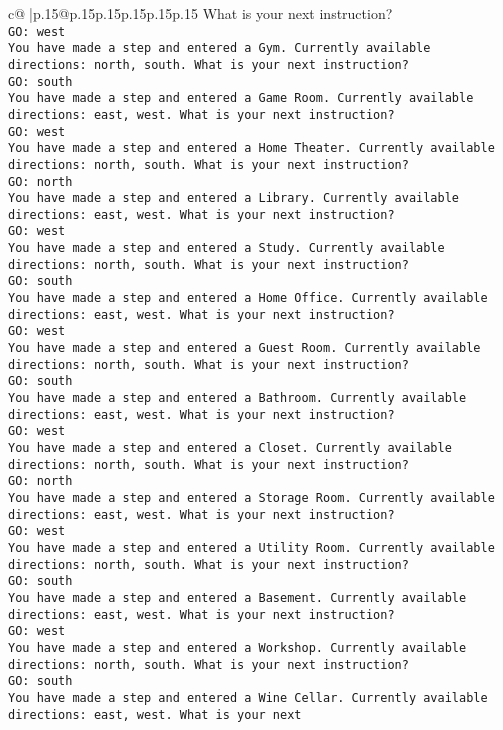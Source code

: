 \documentclass{article}
\begin{document}
{\begin{supertabular}{c@{$\;$}|p{.15\linewidth}@{}p{.15\linewidth}p{.15\linewidth}p{.15\linewidth}p{.15\linewidth}p{.15\linewidth}}
{{{What is your next instruction?\\ \tt GO: west\\ \tt You have made a step and entered a Gym. Currently available directions: north, south. What is your next instruction?\\ \tt GO: south\\ \tt You have made a step and entered a Game Room. Currently available directions: east, west. What is your next instruction?\\ \tt GO: west\\ \tt You have made a step and entered a Home Theater. Currently available directions: north, south. What is your next instruction?\\ \tt GO: north\\ \tt You have made a step and entered a Library. Currently available directions: east, west. What is your next instruction?\\ \tt GO: west\\ \tt You have made a step and entered a Study. Currently available directions: north, south. What is your next instruction?\\ \tt GO: south\\ \tt You have made a step and entered a Home Office. Currently available directions: east, west. What is your next instruction?\\ \tt GO: west\\ \tt You have made a step and entered a Guest Room. Currently available directions: north, south. What is your next instruction?\\ \tt GO: south\\ \tt You have made a step and entered a Bathroom. Currently available directions: east, west. What is your next instruction?\\ \tt GO: west\\ \tt You have made a step and entered a Closet. Currently available directions: north, south. What is your next instruction?\\ \tt GO: north\\ \tt You have made a step and entered a Storage Room. Currently available directions: east, west. What is your next instruction?\\ \tt GO: west\\ \tt You have made a step and entered a Utility Room. Currently available directions: north, south. What is your next instruction?\\ \tt GO: south\\ \tt You have made a step and entered a Basement. Currently available directions: east, west. What is your next instruction?\\ \tt GO: west\\ \tt You have made a step and entered a Workshop. Currently available directions: north, south. What is your next instruction?\\ \tt GO: south\\ \tt You have made a step and entered a Wine Cellar. Currently available directions: east, west. What is your next }}}
\end{supertabular}}
\end{document}
